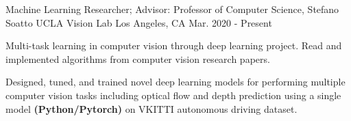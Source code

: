 \cventry
    {Machine Learning Researcher; Advisor: Professor of Computer Science, Stefano Soatto} %
    {UCLA Vision Lab} %
    {Los Angeles, CA} %
    {Mar. 2020 - Present} %
    {
      \begin{cvitems} %
        \item {Multi-task learning in computer vision through deep learning project. 
            Read and implemented algorithms from computer vision research papers. 
        }
        \item {  
        Designed, tuned, and trained novel deep learning models for performing 
        multiple computer vision tasks including optical flow and depth prediction
        using a single model \textbf{(Python/Pytorch)} on VKITTI autonomous driving 
        dataset.
        }
      \end{cvitems}
    } 